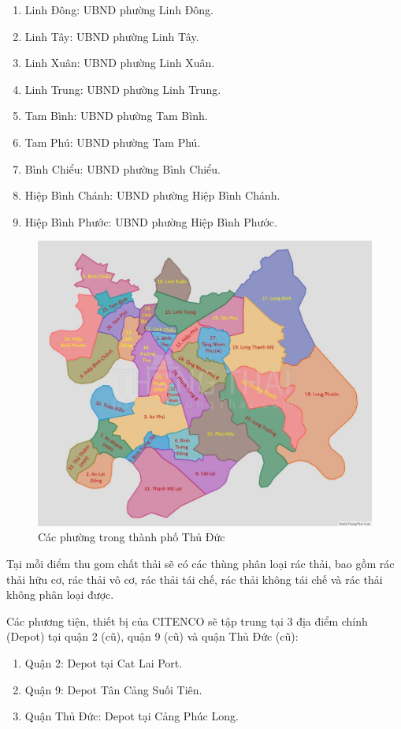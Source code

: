 \begin{enumerate}
            \item Linh Đông: UBND phường Linh Đông.
            \item Linh Tây: UBND phường Linh Tây.
            \item Linh Xuân: UBND phường Linh Xuân.
            \item Linh Trung: UBND phường Linh Trung.
            \item Tam Bình: UBND phường Tam Bình.
            \item Tam Phú: UBND phường Tam Phú.
            \item Bình Chiểu: UBND phường Bình Chiểu.
            \item Hiệp Bình Chánh: UBND phường Hiệp Bình Chánh.
            \item Hiệp Bình Phước: UBND phường Hiệp Bình Phước.
        \end{enumerate}
        
        \newpage
        \begin{figure}[h]
            \centering
            \includegraphics[width=1\linewidth]{imgs/map.jpg}
            \caption{Các phường trong thành phố Thủ Đức}
        \end{figure}
        
        \quad Tại mỗi điểm thu gom chất thải sẽ có các thùng phân loại rác thải, bao gồm rác thải hữu cơ, rác thải vô cơ, rác thải tái chế, rác thải không tái chế và rác thải không phân loại được.
        
        \quad Các phương tiện, thiết bị của CITENCO sẽ tập trung tại 3 địa điểm chính (Depot) tại quận 2 (cũ), quận 9 (cũ) và quận Thủ Đức (cũ):
        \begin{enumerate}
            \item Quận 2: Depot tại Cat Lai Port.
            \item Quận 9: Depot Tân Cảng Suối Tiên.
            \item Quận Thủ Đức: Depot tại Cảng Phúc Long.
        \end{enumerate}
        

